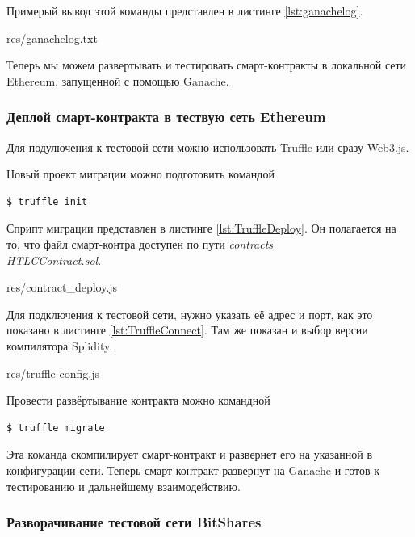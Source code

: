 Примерый вывод этой команды представлен в листинге \ref{lst:ganachelog}. 


{res/ganachelog.txt}

Теперь мы можем развертывать и тестировать смарт-контракты в локальной сети Ethereum, запущенной с помощью Ganache.

\subsubsection{Деплой смарт-контракта в тествую сеть Ethereum}

Для подулючения к тестовой сети можно использовать Truffle или сразу Web3.js.

Новый проект миграции можно подготовить командой

\begin{lstlisting}[style=CommandLineStyle, belowskip=-2 \baselineskip]
$ truffle init
\end{lstlisting}

Сприпт миграции представлен в листинге \ref{lst:TruffleDeploy}. Он полагается на то, что файл смарт-контра доступен по пути \textit{contracts\\HTLCContract.sol}.


{res/contract_deploy.js}

Для подключения к тестовой сети, нужно указать её адрес и порт, как это показано в листинге  \ref{lst:TruffleConnect}. Там же показан и выбор версии компилятора Splidity.


{res/truffle-config.js}

Провести развёртывание контракта можно командной
\begin{lstlisting}[style=CommandLineStyle, belowskip=-2 \baselineskip]
$ truffle migrate
\end{lstlisting}

Эта команда скомпилирует смарт-контракт и развернет его на указанной в конфигурации сети. Теперь смарт-контракт развернут на Ganache и готов к тестированию и дальнейшему взаимодействию.

\subsubsection{Разворачивание тестовой сети BitShares}

